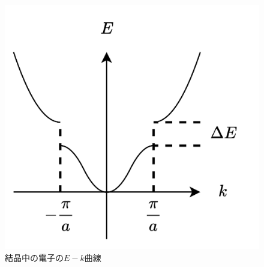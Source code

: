 \begin{figure}
	\centering
	\includegraphics[width=0.4\linewidth]{src/figures/crystal-e-k/crystal-e-k.png}
	\caption{結晶中の電子の$E-k$曲線}\label{fig:crystal-e-k}
\end{figure}
